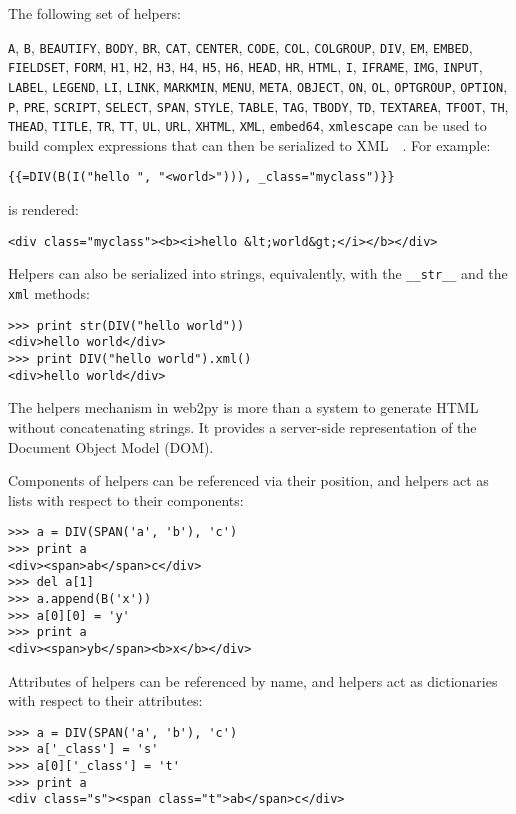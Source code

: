 \documentclass[justified,sixbynine,notoc]{tufte-book}
\def\ft{\small\tt}
\def\inxx#1{\index{#1}}
\begin{document}
\begin{fullwidth}
The following set of helpers:

{\ft A},  {\ft B},  {\ft BEAUTIFY},  {\ft BODY},  {\ft BR},  {\ft CAT},  {\ft CENTER},  {\ft CODE},  {\ft COL}, {\ft COLGROUP}, {\ft DIV},  {\ft EM},  {\ft EMBED},  {\ft FIELDSET},  {\ft FORM},  {\ft H1},  {\ft H2},  {\ft H3},  {\ft H4},  {\ft H5},  {\ft H6},  {\ft HEAD},  {\ft HR},  {\ft HTML},  {\ft I},  {\ft IFRAME},  {\ft IMG},  {\ft INPUT},  {\ft LABEL},  {\ft LEGEND},  {\ft LI},  {\ft LINK},  {\ft MARKMIN},  {\ft MENU},  {\ft META},  {\ft OBJECT},  {\ft ON},  {\ft OL},  {\ft OPTGROUP},  {\ft OPTION},  {\ft P},  {\ft PRE},  {\ft SCRIPT},  {\ft SELECT},  {\ft SPAN},  {\ft STYLE},  {\ft TABLE},  {\ft TAG},  {\ft TBODY},  {\ft TD},  {\ft TEXTAREA},  {\ft TFOOT},  {\ft TH},  {\ft THEAD},  {\ft TITLE},  {\ft TR},  {\ft TT}, {\ft UL},   {\ft URL},  {\ft XHTML},  {\ft XML},  {\ft embed64},  {\ft xmlescape}
\noindent can be used to build complex expressions that can then be serialized to XML~\cite{xml-w}~\cite{xml-o}. For example:
\begin{lstlisting}[keywords={}]
{{=DIV(B(I("hello ", "<world>"))), _class="myclass")}}
\end{lstlisting}
\noindent is rendered:
\begin{lstlisting}[keywords={}]
<div class="myclass"><b><i>hello &lt;world&gt;</i></b></div>
\end{lstlisting}

Helpers can also be serialized into strings, equivalently, with the {\ft \_\_str\_\_} and the {\ft xml} methods:

\begin{lstlisting}
>>> print str(DIV("hello world"))
<div>hello world</div>
>>> print DIV("hello world").xml()
<div>hello world</div>
\end{lstlisting}

\inxx{Document Object Model (DOM)}
The helpers mechanism in web2py is more than a system to generate HTML without concatenating strings. It provides a server-side representation of the Document Object Model (DOM).

Components of helpers can be referenced via their position, and helpers act as lists with respect to their components:
\begin{lstlisting}
>>> a = DIV(SPAN('a', 'b'), 'c')
>>> print a
<div><span>ab</span>c</div>
>>> del a[1]
>>> a.append(B('x'))
>>> a[0][0] = 'y'
>>> print a
<div><span>yb</span><b>x</b></div>
\end{lstlisting}

Attributes of helpers can be referenced by name, and helpers act as dictionaries with respect to their attributes:
\begin{lstlisting}
>>> a = DIV(SPAN('a', 'b'), 'c')
>>> a['_class'] = 's'
>>> a[0]['_class'] = 't'
>>> print a
<div class="s"><span class="t">ab</span>c</div>
\end{lstlisting}


\end{fullwidth}
\end{document}
